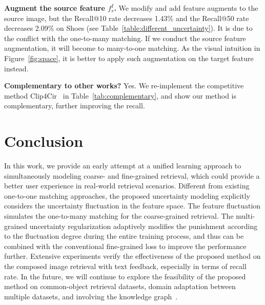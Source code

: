 \documentclass[10pt,twocolumn,letterpaper]{article}
\begin{document}
\noindent\textbf{Augment the source feature $f_s^I$.} We modify and add feature augments to the source image, but the Recall@10 rate decreases
1.43\% and the Recall@50 rate decreases 2.09\% on Shoes (see Table~\ref{table:different_uncertainty}). It is due to the conflict with the one-to-many matching. If we conduct the source feature augmentation, it will become to many-to-one matching. As the visual intuition in Figure~\ref{fig:space}, it is better to apply such augmentation on the target feature instead.

\begin{table}[t]
\scriptsize
    \vspace{-.1in}
    \caption{Complementary to Clip4Cir on FashionIQ. $^*$: We re-implemented the method with one ResNet50.} 
    \label{tab:complementary}\vspace{-.2in}
\end{table}

\noindent\textbf{Complementary to other works?} Yes. We re-implement the competitive method Clip4Cir~\cite{CLIP4Cir} in Table~\ref{tab:complementary}, and show our method is complementary, further improving the recall. 

\section{Conclusion}
In this work, we provide an early attempt at a unified learning approach to simultaneously modeling coarse- and fine-grained retrieval, which could provide a better user experience in real-world retrieval scenarios.
Different from existing one-to-one matching approaches, the proposed uncertainty modeling explicitly considers the uncertainty fluctuation in the feature space. The feature fluctuation simulates the one-to-many matching for the coarse-grained retrieval. The multi-grained uncertainty regularization adaptively modifies the punishment according to the fluctuation degree during the entire training process, and thus can be combined with the conventional fine-grained loss to improve the performance further. Extensive experiments verify the effectiveness of the proposed method on the composed image retrieval with text feedback, especially in terms of recall rate. In the future, we will continue to explore the feasibility of the proposed method on common-object retrieval datasets, domain adaptation between multiple datasets, and involving the knowledge graph~\cite{liu2020hyperbolic,sun2021dynamic}.
\end{document}
